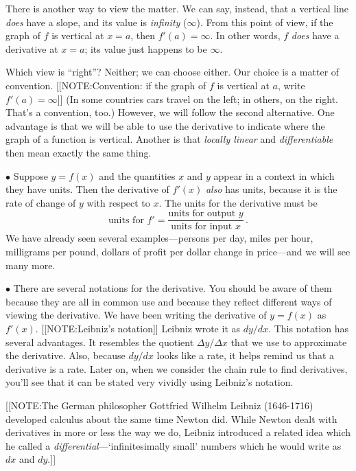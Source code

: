 There is another way to view the matter.  We can say, instead, that a
vertical line {\em does\/} have a slope, and its value is {\em
  infinity\/} ($\infty$).  From this point of view, if the graph of
$f$ is vertical at $x = a$, then $f'(a) = \infty$.  In other words,
$f$ {\em does\/} have a derivative at $x = a$; its value just happens
to be $\infty$.

Which view is ``right''?  Neither; we can choose either.  Our choice
is a matter of convention.  [[NOTE:Convention: if the graph of $f$ is
  vertical at $a$, write $f'(a) = \infty$]] (In some countries cars
travel on the left; in others, on the right.  That's a convention,
too.)  However, we will follow the second alternative.  One advantage
is that we will be able to use the derivative to indicate where the
graph of a function is vertical.  Another is that {\em locally
  linear\/} and {\em differentiable\/} then mean exactly the same
thing.

\noindent$\bullet$ Suppose $y = f(x)$ and the quantities $x$ and $y$ appear in
a context in which they have units.  Then the derivative of $f'(x)$
{\em also\/} has units, because it is the rate of change of $y$ with
respect to $x$.  The units for the derivative must be
\[
\mbox{units for $f'$} = 
		\dfrac{\mbox{units for output $y$}}
		{\mbox{units for input $x$}}\,. 
\]
We have already seen several examples---persons per day, miles per
hour, milligrams per pound, dollars of profit per dollar change in
price---and we will see many more.

\noindent$\bullet$ There are several notations for the derivative.  You should
be aware of them because they are all in common use and because they
reflect different ways of viewing the derivative.  We have been
writing the derivative of $y = f(x)$ as $f'(x)$.
[[NOTE:Leibniz's notation]]
Leibniz wrote it as $dy/dx$.  This notation has several advantages.
It resembles the quotient $\Delta y/\Delta x$ that we use to
approximate the derivative.  Also, because $dy/dx$ looks like a rate,
it helps remind us that a derivative is a rate.  Later on, when we
consider the chain rule to find derivatives, you'll see that it can be
stated very vividly using Leibniz's
notation.

[[NOTE:The German philosopher Gottfried Wilhelm Leibniz (1646-1716)
  developed calculus about the same time Newton did.  While Newton
  dealt with derivatives in more or less the way we do, Leibniz
  introduced a related idea which he called a {\em
    differential}\label{differential}---`infinitesimally small'
  numbers which he would write as $dx$ and $dy$.]]

